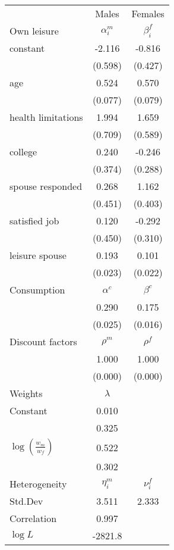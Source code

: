 \begin{tabular}{lcc} 
\hline\hline 
 & Males & Females \\ 
Own leisure & $\alpha_{i}^{m}$ & $\beta_{i}^{f}$ \\ 
constant & -2.116 & -0.816 \\ 
 & (0.598) & (0.427) \\ 
age & 0.524 & 0.570 \\ 
 & (0.077) & (0.079) \\ 
health limitations & 1.994 & 1.659 \\ 
 & (0.709) & (0.589) \\ 
college & 0.240 & -0.246 \\ 
 & (0.374) & (0.288) \\ 
spouse responded & 0.268 & 1.162 \\ 
 & (0.451) & (0.403) \\ 
satisfied job & 0.120 & -0.292 \\ 
 & (0.450) & (0.310) \\ 
leisure spouse & 0.193 & 0.101 \\ 
 & (0.023) & (0.022) \\ 
Consumption & $\alpha^{c}$ & $\beta^{c}$ \\ 
 & 0.290 & 0.175 \\ 
 & (0.025) & (0.016) \\ 
Discount factors & $\rho^m$ & $\rho^f$ \\ 
 & 1.000 & 1.000 \\ 
 & (0.000) & (0.000) \\ 
Weights & $\lambda$ &  \\ 
Constant & 0.010 &  \\ 
 & 0.325 &  \\ 
$\log(\frac{w_m}{w_f})$ & 0.522 &  \\ 
 & 0.302 &  \\ 
Heterogeneity & $\eta_i^m$ & $\nu_i^f$ \\ 
Std.Dev & 3.511 & 2.333 \\ 
Correlation & 0.997 &  \\ 
\hline 
$\log L$ & -2821.8 & \\ 
\hline \hline 
\end{tabular} 
